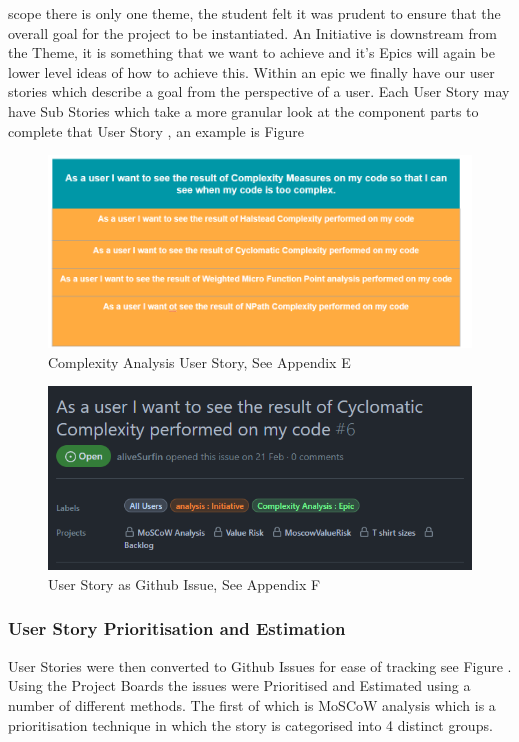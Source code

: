 scope there is only one theme, the student felt it was prudent to ensure that the overall goal for the project to be instantiated.
An Initiative is downstream from the Theme, it is something that we want to achieve and it's Epics will again be lower level ideas of how to 
achieve this. Within an epic we finally have our user stories which describe a goal from the perspective of a user. Each User Story may have Sub Stories which take a 
more granular look at the component parts to complete that User Story , an example is Figure 
\begin{figure}
    \includegraphics[width=.5\textwidth]{images/user-stories-example.png}
    \caption{Complexity Analysis User Story, See Appendix E}
    \label{fig:complexity-userstory}
\end{figure}
\begin{figure}
    \includegraphics[width=.5\textwidth]{images/github-issue.png}
    \caption{User Story as Github Issue, See Appendix F}
    \label{fig:github-issue}
\end{figure}
\subsubsection{\textbf{User Story Prioritisation and Estimation}}
User Stories were then converted to Github Issues for ease of tracking see Figure .
\newline
Using the Project Boards the issues were Prioritised and Estimated using a number of different methods.
The first of which is MoSCoW analysis which is a prioritisation technique in which the story is categorised into 4 distinct groups.

